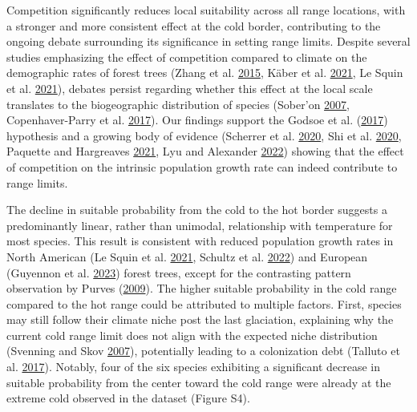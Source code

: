 \documentclass[12pt]{article}
\begin{document}
Competition significantly reduces local suitability across all range
locations, with a stronger and more consistent effect at the cold
border, contributing to the ongoing debate surrounding its significance
in setting range limits. Despite several studies emphasizing the effect
of competition compared to climate on the demographic rates of forest
trees (Zhang et al. \protect\hyperlink{ref-Zhang2015}{2015}, Käber et
al. \protect\hyperlink{ref-Kaber2021}{2021}, Le Squin et al.
\protect\hyperlink{ref-LeSquin2021}{2021}), debates persist regarding
whether this effect at the local scale translates to the biogeographic
distribution of species (Sober\a'on
\protect\hyperlink{ref-Soberon2007}{2007}, Copenhaver-Parry et al.
\protect\hyperlink{ref-CopenhaverParry2017}{2017}). Our findings support
the Godsoe et al. (\protect\hyperlink{ref-Godsoe2017}{2017}) hypothesis
and a growing body of evidence (Scherrer et al.
\protect\hyperlink{ref-Scherrer2020}{2020}, Shi et al.
\protect\hyperlink{ref-Shi2020}{2020}, Paquette and Hargreaves
\protect\hyperlink{ref-Paquette2021}{2021}, Lyu and Alexander
\protect\hyperlink{ref-Lyu2022}{2022}) showing that the effect of
competition on the intrinsic population growth rate can indeed
contribute to range limits.

The decline in suitable probability from the cold to the hot border
suggests a predominantly linear, rather than unimodal, relationship with
temperature for most species. This result is consistent with reduced
population growth rates in North American (Le Squin et al.
\protect\hyperlink{ref-LeSquin2021}{2021}, Schultz et al.
\protect\hyperlink{ref-schultz2022}{2022}) and European (Guyennon et al.
\protect\hyperlink{ref-Guyennon2023}{2023}) forest trees, except for the
contrasting pattern observation by Purves
(\protect\hyperlink{ref-Purves2009}{2009}). The higher suitable
probability in the cold range compared to the hot range could be
attributed to multiple factors. First, species may still follow their
climate niche post the last glaciation, explaining why the current cold
range limit does not align with the expected niche distribution
(Svenning and Skov \protect\hyperlink{ref-Svenning2007}{2007}),
potentially leading to a colonization debt (Talluto et al.
\protect\hyperlink{ref-Talluto2017}{2017}). Notably, four of the six
species exhibiting a significant decrease in suitable probability from
the center toward the cold range were already at the extreme cold
observed in the dataset (Figure S4).
\end{document}
